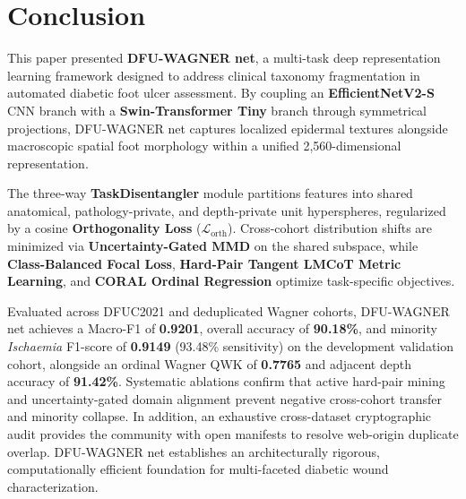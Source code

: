 \documentclass[journal]{IEEEtran}
\begin{document}
\section{Conclusion}
This paper presented \textbf{DFU-WAGNER net}, a multi-task deep representation learning framework designed to address clinical taxonomy fragmentation in automated diabetic foot ulcer assessment. By coupling an \textbf{EfficientNetV2-S} CNN branch with a \textbf{Swin-Transformer Tiny} branch through symmetrical projections, DFU-WAGNER net captures localized epidermal textures alongside macroscopic spatial foot morphology within a unified 2,560-dimensional representation. 

The three-way \textbf{TaskDisentangler} module partitions features into shared anatomical, pathology-private, and depth-private unit hyperspheres, regularized by a cosine \textbf{Orthogonality Loss} ($\mathcal{L}_{\text{orth}}$). Cross-cohort distribution shifts are minimized via \textbf{Uncertainty-Gated MMD} on the shared subspace, while \textbf{Class-Balanced Focal Loss}, \textbf{Hard-Pair Tangent LMCoT Metric Learning}, and \textbf{CORAL Ordinal Regression} optimize task-specific objectives. 

Evaluated across DFUC2021 and deduplicated Wagner cohorts, DFU-WAGNER net achieves a Macro-F1 of \textbf{0.9201}, overall accuracy of \textbf{90.18\%}, and minority \textit{Ischaemia} F1-score of \textbf{0.9149} (93.48\% sensitivity) on the development validation cohort, alongside an ordinal Wagner QWK of \textbf{0.7765} and adjacent depth accuracy of \textbf{91.42\%}. Systematic ablations confirm that active hard-pair mining and uncertainty-gated domain alignment prevent negative cross-cohort transfer and minority collapse. In addition, an exhaustive cross-dataset cryptographic audit provides the community with open manifests to resolve web-origin duplicate overlap. DFU-WAGNER net establishes an architecturally rigorous, computationally efficient foundation for multi-faceted diabetic wound characterization.



\end{document}
